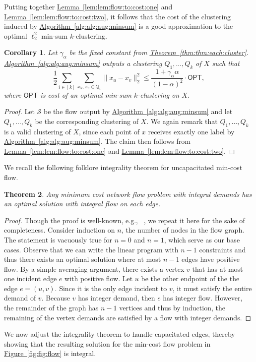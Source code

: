 \documentclass[10pt,a4paper]{amsart}
\newtheorem{theorem}{Theorem}[section]
\newtheorem{corollary}[theorem]{Corollary}
\newcommand{\namedref}[2]{\hyperref[#2]{#1~\ref*{#2}}}
\newcommand{\thmlab}[1]{\label{thm:#1}}
\newcommand{\thmref}[1]{\namedref{Theorem}{thm:#1}}
\newcommand{\lemref}[1]{\namedref{Lemma}{lem:#1}}
\newcommand{\corlab}[1]{\label{cor:#1}}
\newcommand{\figref}[1]{\namedref{Figure}{fig:#1}}
\renewcommand{\algref}[1]{\namedref{Algorithm}{alg:#1}}
\def \OPT    {\mdef{\mathsf{OPT}}}
\def \calS    {\mdef{\mathcal{S}}}
\newcommand{\mdef}[1]{{\ensuremath{#1}}\xspace}  %
\begin{document}
Putting together \lemref{lem:flow:to:cost:one} and \lemref{lem:flow:to:cost:two}, it follows that the cost of the clustering induced by \algref{alg:aug:minsum} is a good approximation to the optimal $\ell_2^2$ min-sum $k$-clustering. 
\begin{corollary}
\corlab{cor:aug:correctness}
Let $\gamma_\alpha$ be the fixed constant from \thmref{thm:each:cluster}. 
\algref{alg:aug:minsum} outputs a clustering $Q_1,\ldots,Q_k$ of $X$ such that
\[\frac{1}{2}\sum_{i\in[k]}\sum_{x_u,x_v\in Q_i}\|x_u-x_v\|_2^2\le\frac{1+\gamma_\alpha\alpha}{(1-\alpha)^2}\cdot\OPT,\]
where $\OPT$ is cost of an optimal min-sum $k$-clustering on $X$. 
\end{corollary}
\begin{proof}
Let $\calS$ be the flow output by \algref{alg:aug:minsum} and let $Q_1,\ldots,Q_k$ be the corresponding clustering of $X$. 
We again remark that $Q_1,\ldots,Q_k$ is a valid clustering of $X$, since each point of $x$ receives exactly one label by \algref{alg:aug:minsum}. 
The claim then follows from \lemref{lem:flow:to:cost:one} and \lemref{lem:flow:to:cost:two}. 
\end{proof}
We recall the following folklore integrality theorem for uncapacitated min-cost flow. 
\begin{theorem}
\thmlab{thm:integral:sol}
Any minimum cost network flow problem with integral demands has an optimal solution with integral flow on each edge. 
\end{theorem}
\begin{proof}
Though the proof is well-known, e.g., ~\cite{Conitzer12}, we repeat it here for the sake of completeness. 
Consider induction on $n$, the number of nodes in the flow graph. 
The statement is vacuously true for $n=0$ and $n=1$, which serve as our base cases. 
Observe that we can write the linear program with $n-1$ constraints and thus there exists an optimal solution where at most $n-1$ edges have positive flow. 
By a simple averaging argument, there exists a vertex $v$ that has at most one incident edge $e$ with positive flow. 
Let $u$ be the other endpoint of the the edge $e=(u,v)$. 
Since it is the only edge incident to $v$, it must satisfy the entire demand of $v$. 
Because $v$ has integer demand, then $e$ has integer flow. 
However, the remainder of the graph has $n-1$ vertices and thus by induction, the remaining of the vertex demands are satisfied by a flow with integer demands. 
\end{proof}
We now adjust the integrality theorem to handle capacitated edges, thereby showing that the resulting solution for the min-cost flow problem in \figref{fig:flow} is integral.
\end{document}
